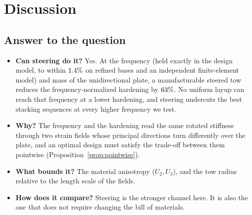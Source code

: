 \section{Discussion}\label{sec:discussion}

\subsection{Answer to the question}
\begin{itemize}[itemsep=1pt]
\item \textbf{Can steering do it?} Yes. At the frequency (held exactly in the design
  model, to within $1.4\%$ on refined bases and an independent finite-element model) and mass of the unidirectional plate, a manufacturable steered tow reduces the frequency-normalized
  hardening by $63\%$. No uniform layup can reach that frequency at a lower
  hardening, and steering undercuts the best stacking sequences at every higher
  frequency we test.
\item \textbf{Why?} The frequency and the hardening read the same rotated stiffness
  through two strain fields whose principal directions turn differently over the plate,
  and an optimal design must satisfy the trade-off between them pointwise
  (Proposition~\ref{prop:pointwise}).
\item \textbf{What bounds it?} The material anisotropy ($U_2,U_3$), and the tow radius
  relative to the length scale of the fields.
\item \textbf{How does it compare?} Steering is the stronger channel here. It is also
  the one that does not require changing the bill of materials.
\end{itemize}

